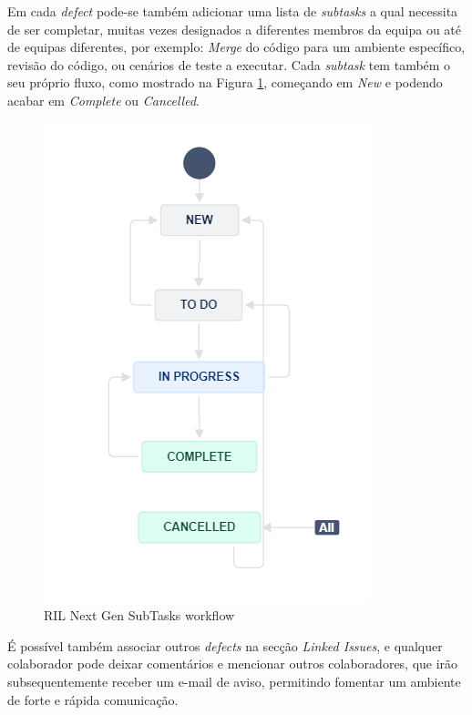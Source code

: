             Em cada \textit{defect} pode-se também adicionar uma lista de \textit{subtasks} a qual necessita de ser completar, muitas vezes designados a diferentes membros da equipa ou até de equipas diferentes, por exemplo: \textit{Merge} do código para um ambiente específico, revisão do código, ou cenários de teste a executar. Cada \textit{subtask} tem também o seu próprio fluxo, como mostrado na Figura \ref{fig:ril-nextgen-subtasks-workflow}, começando em \textit{New} e podendo acabar em \textit{Complete} ou \textit{Cancelled}.

            \begin{figure}[htbp]
                \centering
                \includegraphics[scale=1.6]{imgs/NextGenSubTaskWorkflow.png}
                \caption{RIL Next Gen SubTasks workflow}\label{fig:ril-nextgen-subtasks-workflow}
            \end{figure}

            É possível também associar outros \textit{defects} na secção \textit{Linked Issues}, e qualquer colaborador pode deixar comentários e mencionar outros colaboradores, que irão subsequentemente receber um e-mail de aviso, permitindo fomentar um ambiente de forte e rápida comunicação.

